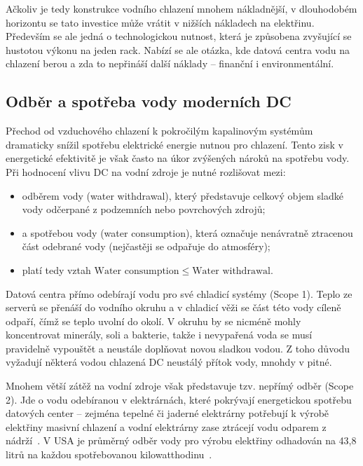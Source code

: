 Ačkoliv je tedy konstrukce vodního chlazení mnohem nákladnější, v dlouhodobém horizontu se tato investice může vrátit v nižších nákladech na elektřinu. Především se ale jedná o technologickou nutnost, která je způsobena zvyšující se hustotou výkonu na jeden rack. Nabízí se ale otázka, kde datová centra vodu na chlazení berou a zda to nepřináší další náklady -- finanční i environmentální.

\subsection{Odběr a spotřeba vody moderních DC}
\label{subsec:voda}

Přechod od vzduchového chlazení k pokročilým kapalinovým systémům dramaticky snížil spotřebu elektrické energie nutnou pro chlazení. Tento zisk v energetické efektivitě je však často na úkor zvýšených nároků na spotřebu vody. Při hodnocení vlivu DC na vodní zdroje je nutné rozlišovat mezi:

\begin{itemize}
    \item odběrem vody (water withdrawal), který představuje celkový objem sladké vody odčerpané z podzemních nebo povrchových zdrojů;
    \item a spotřebou vody (water consumption), která označuje nenávratně ztracenou část odebrané vody (nejčastěji se odpařuje do atmosféry);~\cite{li_making_2025}
    \item platí tedy vztah $\text{Water consumption} \le \text{Water withdrawal}.$
\end{itemize}

Datová centra přímo odebírají vodu pro své chladicí systémy (Scope 1). Teplo ze serverů se přenáší do vodního okruhu a v chladicí věži se část této vody cíleně odpaří, čímž se teplo uvolní do okolí. V okruhu by se nicméně mohly koncentrovat minerály, soli a bakterie, takže i nevypařená voda se musí pravidelně vypouštět a neustále doplňovat novou sladkou vodou. Z toho důvodu vyžadují některá vodou chlazená DC neustálý přítok vody, mnohdy v pitné.~\cite{li_making_2025}

Mnohem větší zátěž na vodní zdroje však představuje tzv. nepřímý odběr (Scope 2). Jde o vodu odebíranou v elektrárnách, které pokrývají energetickou spotřebu datových center -- zejména tepelné či jaderné elektrárny potřebují k výrobě elektřiny masivní chlazení a vodní elektrárny zase ztrácejí vodu odparem z nádrží~\cite{li_making_2025, LBNL-2001637}. V USA je průměrný odběr vody pro výrobu elektřiny odhadován na 43,8 litrů na každou spotřebovanou kilowatthodinu~\cite{li_making_2025}.


